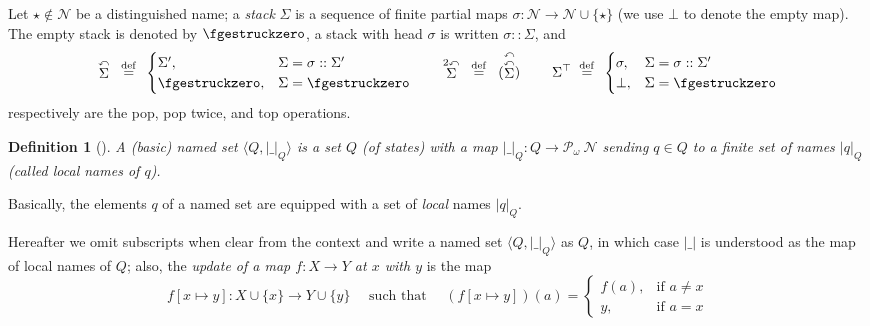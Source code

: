 \documentclass[runningheads,a4paper]{llncs}
\newcommand{\longversion}[1]{#1}
\newcommand{\stk}{\Sigma}
\newcommand{\poptr}{\curvearrowleft}
\newcommand{\popstk}[1]{\stackrel{\poptr}{#1}}
\newcommand{\popstktwo}[1]{\stackrel{2\poptr}{#1}}
\newcommand{\topstk}[1]{{#1}^\top}
\newcommand{\estk}{\fgestruckzero}
\newcommand{\fresh}{\star}
\newcommand{\weight}[1]{|#1|}
\newcommand{\mmdef}{\mbox{$\;\;\stackrel{\mathrm{def}}{=}\;\;$}}
\newcommand{\upd}[2]{[{#1} \mapsto {#2}]}
\newcommand{\names}{\mbox{$\mathcal{N}$}}
\newtheorem{definition}{Theorem}[section]
\newtheorem{definition}{Definition}[section]
\newcommand{\fpart}[1]{\ensuremath{\mathcal{P}_{\omega}\ {#1}}}
\newcommand{\tuple}[1]{\langle#1\rangle}
\begin{document}
Let $\fresh \not\in \names$ be a distinguished name; a \emph{stack}
$\stk$ is a sequence of finite partial maps $\sigma: \names \to \names
\cup \{\fresh\}$ (we use $\bot$ to denote the empty map).
The empty stack is denoted by $\estk$, a stack with head $\sigma$ is
written $\sigma :: \stk$, and
\[
\popstk{\stk} \mmdef \begin{cases}
    \stk', &  \stk = \sigma::\stk'
    \\
    \estk, & \stk = \estk
  \end{cases}
\qquad
\popstktwo \stk \mmdef \popstk{(\popstk \stk)}
\qquad
\topstk{\stk} \mmdef \begin{cases}
    \sigma, &  \stk = \sigma::\stk'
    \\
    \bot, & \stk = \estk
  \end{cases}
\]
respectively are the pop, pop twice, and top operations.

\begin{definition}[\cite{pis99}]\label{def:nset}
  A \emph{(basic) named set} $\tuple{Q,\weight{\_}_Q}$ is a set $Q$
  (of states) with a map $\weight{\_}_Q: Q \to \fpart \names$ sending
  $q \in Q$ to a finite set of names $\weight{q}_Q$ (called
  \emph{local names of $q$}).
\end{definition}
\longversion{
  Basically, the elements $q$ of a named set are equipped with a set
  of \emph{local} names $\weight q_Q$.
}
Hereafter we omit subscripts when clear from the context and write a
named set $\tuple{Q,\weight{\_}_Q}$ as $Q$, in which case
$\weight{\_}$ is understood as the map of local names of $Q$; also,
the \emph{update of a map $f: X \to Y$ at $x$ with $y$} is the map
\[
f\upd x y:
X \cup \{x\} \to Y \cup \{y\}
\quad \text{ such that } \quad
(f\upd x y)(a) = \left\{\begin{array}{ll}
    f(a), & \text{if } a \neq x
    \\
    y,  & \text{if } a = x
\end{array}\right.\]
\end{document}
